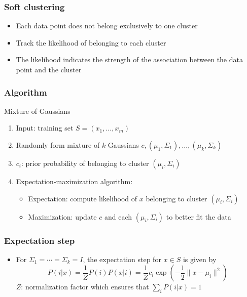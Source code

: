\documentclass[10pt]{beamer}
\begin{document}
\begin{frame}
  \frametitle{Soft clustering}
  \begin{itemize}
    \item Each data point does not belong exclusively to one cluster
	\item Track the {\color{blue} likelihood} of belonging to each cluster
	\item The likelihood indicates the strength of the association between the data point and the cluster
  \end{itemize}
\end{frame}

\begin{frame}
  \frametitle{Algorithm}
  \begin{block}{Mixture of Gaussians}
  \begin{enumerate}
	\item Input: training set $S=(x_1,\ldots,x_m)$
	\item Randomly form mixture of $k$ Gaussians $c,(\mu_1,\Sigma_1),\ldots,(\mu_k,\Sigma_k)$
	\item $c_i$: prior probability of belonging to cluster $(\mu_i,\Sigma_i)$
	\item Expectation-maximization algorithm:
  \begin{itemize}
    \item Expectation: compute likelihood of $x$ belonging to cluster $(\mu_i,\Sigma_i)$
	\item Maximization: update $c$ and each $(\mu_i,\Sigma_i)$ to better fit the data
  \end{itemize}
  \end{enumerate}
  \end{block}
\end{frame}

\begin{frame}
  \frametitle{Expectation step}
  \begin{itemize}
    \item For $\Sigma_1=\cdots=\Sigma_k=I$, the expectation step for $x\in S$ is given by
	\[P(i|x) = \frac 1 Z P(i)P(x|i) = \frac 1 Z c_i \exp \left( - \frac 1 2 \lVert x - \mu_i \rVert^2 \right)\]
	$Z$: normalization factor which ensures that $\sum_i P(i|x) = 1$
  \end{itemize}
\end{frame}
\end{document}
